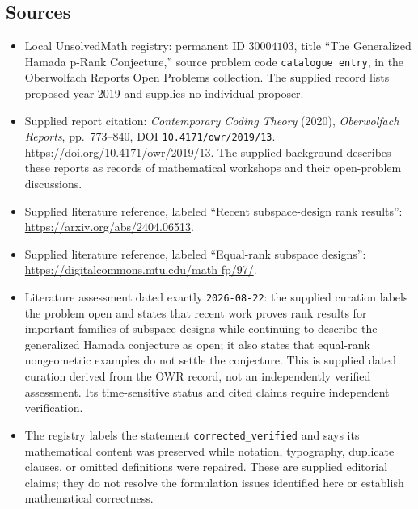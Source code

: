 \documentclass[11pt]{article}
\begin{document}
\subsection{Sources}
\begin{itemize}
\item Local UnsolvedMath registry: permanent ID \(30004103\), title ``The Generalized Hamada p-Rank Conjecture,'' source problem code \texttt{catalogue entry}, in the Oberwolfach Reports Open Problems collection. The supplied record lists proposed year 2019 and supplies no individual proposer.
\item Supplied report citation: \emph{Contemporary Coding Theory} (2020), \emph{Oberwolfach Reports}, pp.\ 773--840, DOI \texttt{10.4171/owr/2019/13}. \url{https://doi.org/10.4171/owr/2019/13}. The supplied background describes these reports as records of mathematical workshops and their open-problem discussions.
\item Supplied literature reference, labeled ``Recent subspace-design rank results'': \url{https://arxiv.org/abs/2404.06513}.
\item Supplied literature reference, labeled ``Equal-rank subspace designs'': \url{https://digitalcommons.mtu.edu/math-fp/97/}.
\item Literature assessment dated exactly \texttt{2026-08-22}: the supplied curation labels the problem open and states that recent work proves rank results for important families of subspace designs while continuing to describe the generalized Hamada conjecture as open; it also states that equal-rank nongeometric examples do not settle the conjecture. This is supplied dated curation derived from the OWR record, not an independently verified assessment. Its time-sensitive status and cited claims require independent verification.
\item The registry labels the statement \texttt{corrected\_verified} and says its mathematical content was preserved while notation, typography, duplicate clauses, or omitted definitions were repaired. These are supplied editorial claims; they do not resolve the formulation issues identified here or establish mathematical correctness.
\end{itemize}
\end{document}
